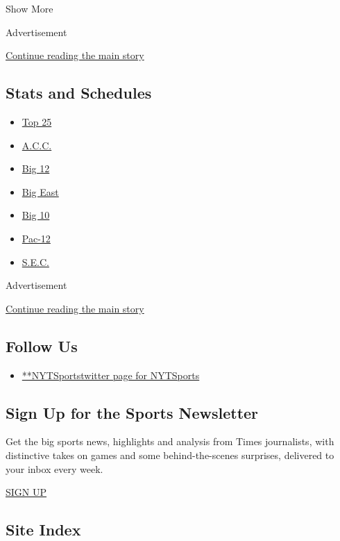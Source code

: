 Show More

Advertisement

\protect\hyperlink{after-mid1}{Continue reading the main story}

\hypertarget{stats-and-schedules}{%
\subsection{Stats and Schedules}\label{stats-and-schedules}}

\begin{itemize}
\tightlist
\item
  \protect\hyperlink{}{Top 25}
\item
  \protect\hyperlink{}{A.C.C.}
\item
  \protect\hyperlink{}{Big 12}
\item
  \protect\hyperlink{}{Big East}
\item
  \protect\hyperlink{}{Big 10}
\item
  \protect\hyperlink{}{Pac-12}
\item
  \protect\hyperlink{}{S.E.C.}
\end{itemize}

Advertisement

\protect\hyperlink{after-mktg}{Continue reading the main story}

\hypertarget{follow-us}{%
\subsection{Follow Us}\label{follow-us}}

\begin{itemize}
\tightlist
\item
  \href{https://twitter.com/NYTSports}{**NYTSportstwitter page for
  NYTSports}
\end{itemize}

\hypertarget{sign-up-for-the-sports-newsletter}{%
\subsection{Sign Up for the Sports
Newsletter}\label{sign-up-for-the-sports-newsletter}}

Get the big sports news, highlights and analysis from Times journalists,
with distinctive takes on games and some behind-the-scenes surprises,
delivered to your inbox every week.

\href{/newsletters/signup/SP}{SIGN UP}

\hypertarget{site-index}{%
\subsection{Site Index}\label{site-index}}

